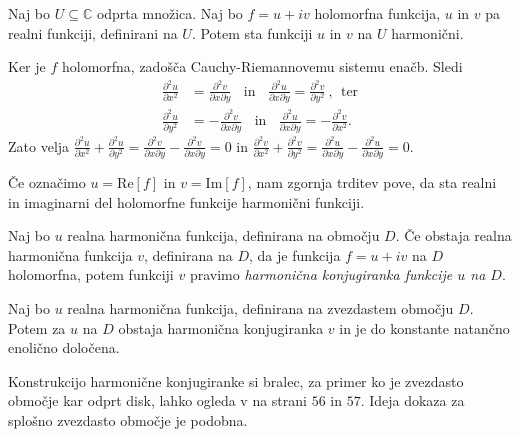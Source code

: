 \documentclass[mat1, tisk]{fmfdelo}
\begin{document}
    \begin{trditev}
        \label{hh}
        Naj bo $U \subseteq \mathbb{C}$ odprta množica. Naj bo $f = u + iv$ holomorfna funkcija, $u$ in $v$ pa realni funkciji, definirani na $U$. Potem sta funkciji $u$ in $v$ na $U$ harmonični.
    \end{trditev}

    \begin{dokaz}
        Ker je $f$ holomorfna, zadošča Cauchy-Riemannovemu sistemu enačb. Sledi
        \begin{align*}
            \frac{\partial^2 u}{\partial x^2} &= \frac{\partial^2 v}{\partial x \partial y}~~~~\text{in}~~~~\frac{\partial^2 u}{\partial x \partial y} = \frac{\partial^2 v}{\partial y^2}~,~~\text{ter}\\ 
            \frac{\partial^2 u}{\partial y^2} &=  - \frac{\partial^2 v}{\partial x \partial y}~~~~\text{in}~~~~\frac{\partial^2 u}{\partial x \partial y} =  - \frac{\partial^2 v}{\partial x^2}.
        \end{align*}
        Zato velja $\frac{\partial^2 u}{\partial x^2} + \frac{\partial^2 u}{\partial y^2} = \frac{\partial^2 v}{\partial x \partial y} - \frac{\partial^2 v}{\partial x \partial y} =0$ in $\frac{\partial^2 v}{\partial x^2} + \frac{\partial^2 v}{\partial y^2} = \frac{\partial^2 u}{\partial x \partial y} - \frac{\partial^2 u}{\partial x \partial y}=0$.
    \end{dokaz}

    \begin{opomba}
        Če označimo $u = \text{Re}[f]$ in $v = \text{Im}[f]$, nam zgornja trditev pove, da sta realni in imaginarni del holomorfne funkcije harmonični funkciji. 
    \end{opomba}

    \begin{definicija}
        Naj bo $u$ realna harmonična funkcija, definirana na območju $D$. Če obstaja realna harmonična funkcija $v$, definirana na $D$, da je funkcija $f = u + iv$ na $D$ holomorfna, potem funkciji $v$ pravimo \emph{harmonična konjugiranka funkcije $u$ na $D$}.    
    \end{definicija}

    \begin{trditev}
        \label{konj}
        Naj bo $u$ realna harmonična funkcija, definirana na zvezdastem območju $D$. Potem za $u$ na $D$ obstaja harmonična konjugiranka $v$ in je do konstante natančno enolično določena. 
    \end{trditev}
    \begin{dokaz}
        Konstrukcijo harmonične konjugiranke si bralec, za primer ko je zvezdasto območje kar odprt disk, lahko ogleda v \cite{osnova} na strani $56$ in $57$. 
        Ideja dokaza za splošno zvezdasto območje je podobna. 
    \end{dokaz}
\end{document}
